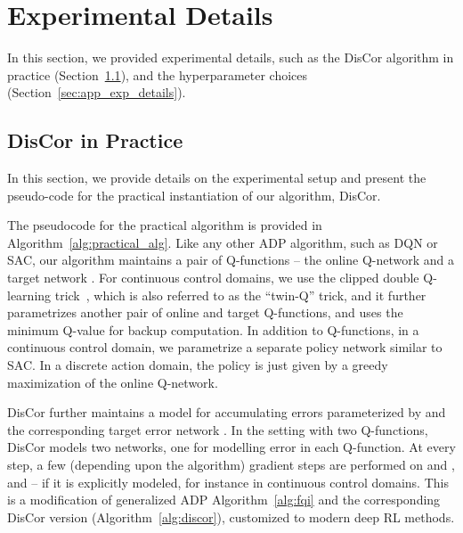 \documentclass[jmlr]{article}
\begin{document}
\section{Experimental Details}
\label{app:exp_details}
In this section, we provided experimental details, such as the DisCor algorithm in practice (Section~\ref{sec:discor_practice}), and the hyperparameter choices (Section~\ref{sec:app_exp_details}).

\subsection{DisCor in Practice}
\label{sec:discor_practice}
In this section, we provide details on the experimental setup and present the pseudo-code for the practical instantiation of our algorithm, DisCor.

The pseudocode for the practical algorithm is provided in Algorithm~\ref{alg:practical_alg}. Like any other ADP algorithm, such as DQN or SAC, our algorithm maintains a pair of Q-functions -- the online Q-network  and a target network . For continuous control domains, we use the clipped double Q-learning trick~\cite{pmlr-v80-fujimoto18a}, which is also referred to as the ``twin-Q'' trick, and it further parametrizes another pair of online and target Q-functions, and uses the minimum Q-value for backup computation. In addition to Q-functions, in a continuous control domain, we parametrize a separate policy network  similar to SAC. In a discrete action domain, the policy is just given by a greedy maximization of the online Q-network. 

DisCor further maintains a model for accumulating errors  parameterized by  and the corresponding target error network . In the setting with two Q-functions, DisCor models two networks, one for modelling error in each Q-function. At every step, a few (depending upon the algorithm) gradient steps are performed on  and , and  -- if it is explicitly modeled, for instance in continuous control domains. This is a modification of generalized ADP Algorithm~\ref{alg:fqi} and the corresponding DisCor version (Algorithm~\ref{alg:discor}), customized to modern deep RL methods.
\end{document}
